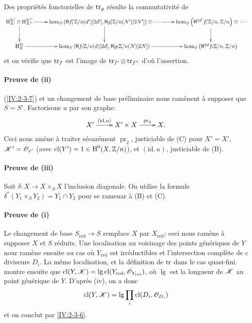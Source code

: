 Des propri\'et\'es fonctorielles de $\operatorname{tr}_g$ \cite[XVIII.2.12]{sga4} r\'esulte 
la commutativit\'e de 
\[\xymatrix{
  \h_{X'}^{2c'}\otimes \h_{X''}^{2 c''}\ar[r] \ar[d] 
    & \hom_S\left(\R f_!' \dZ/n(d')[2 d'],\R g_!'\dZ/n(N')[2 N']\right)\otimes \cdots \ar[r] \ar[d] 
    & \hom_S\left(\R^{2 d'} f_!' \dZ/n,\dZ/n\right) \otimes \cdots \ar[d] \\
  \h_X^{2 c} \ar[r] 
    & \hom_S\left(\R f_!\dZ/n(d)[2 d],\R g_!\dZ/n(N)[2 N]\right) \ar[r] 
    & \hom_S\left(\R ^{2 d}f_!\dZ/n,\dZ/n\right)
}\]
et on v\'erifie que $\operatorname{tr}_f$ est l'image de $\operatorname{tr}_{f'}\otimes \operatorname{tr}_{f''}$ d'o\`u 
l'assertion. 

\paragraph{Preuve de (ii)}
(\ref{IV:2-3-7}) et un changement de base pr\'eliminaire nous ram\`enent \`a 
supposer que $S=S'$. Factorisons $u$ par son graphe:
\[\xymatrix{
  X' \ar[r]^-{(\text{id},u)} 
    & X'\times X \ar[r]^-{\operatorname{pr}_2} 
    & X \text{.}
}\]
Ceci nous am\`ene \`a traiter s\'eoar\'ement $\operatorname{pr}_2$, justiciable 
de (C) pour $X'=X'$, $\mathscr{K}'=\mathscr{O}_{x'}$ (avec $\operatorname{cl}(Y')=1\in \operatorname{H}^0(X,\mathbb{Z}/n)$), et 
$(\text{id},u)$, justiciable de (B). 

\paragraph{Preuve de (iii)}
Soit $\delta:X\to X\times_S X$ l'inclusion diagonale. On utilise la formule 
$\delta^\ast(Y_1\times_S Y_2) = Y_1\cap Y_2$ pour se ramenar \`a 
(B) et (C). 

\paragraph{Preuve de (i)}
Le changement de base $S_\text{red}\to S$ remplace $X$ par $X_\text{red}$; ceci 
nous ram\`ene \`a supposer $X$ et $S$ r\'eduits. Une localisation au voisinage 
des points g\'en\'eriques de $Y$ nour ram\`ene ensuite au cas o\`u 
$Y_\text{red}$ est irr\'eductibles et l'intersection compl\`ete de $c$ 
diviseurs $D_i$. La m\^eme localisation, et la d\'efinition de $\operatorname{tr}$ dans le 
cas quasi-fini. montre ensuite que 
$\operatorname{cl}(Y,\mathscr{K})=\operatorname{lg}\operatorname{cl}(Y_\text{red},\mathscr{O}_{Y_\text{red}})$, o\`u 
$\operatorname{lg}$ est la longueur de $\mathscr{K}$ au point g\'en\'erique de $Y$. 
D'apr\`es (iv), on a donc 
\[
  \operatorname{cl}(Y,\mathscr{K}) = \operatorname{lg} \prod_i \operatorname{cl}(D_i,\mathscr{O}_{D_i})
\]
et on conclut par \ref{IV:2-3-6}. 





